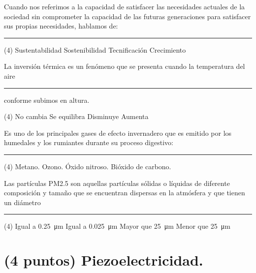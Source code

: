 \documentclass[12pt, letter]{exam}
\begin{document}
\begin{questions}
    \question Cuando nos referimos a la capacidad de satisfacer las necesidades actuales de la sociedad sin comprometer la capacidad de las futuras generaciones para satisfacer sus propias necesidades, hablamos de: \rule{2cm}{0.1mm}
    \begin{tasks}(4)
        \task Sustentabilidad
        \task Sostenibilidad
        \task Tecnificación
        \task Crecimiento
    \end{tasks}
    \question La inversión térmica es un fenómeno que se presenta cuando la temperatura del aire \rule{2cm}{0.1mm} conforme subimos en altura.
    \begin{tasks}(4)
        \task No cambia
        \task Se equilibra
        \task Disminuye
        \task Aumenta
    \end{tasks}
    \question Es uno de los principales gases de efecto invernadero que es emitido por los humedales y los rumiantes durante su proceso digestivo: \rule{2cm}{0.1mm}
    \begin{tasks}(4)
        \task Metano.
        \task Ozono.
        \task Óxido nitroso.
        \task Bióxido de carbono.
    \end{tasks}
    \question Las partículas PM2.5 son aquellas partículas sólidas o líquidas de diferente composición y tamaño que se encuentran dispersas en la atmósfera y que tienen un diámetro \rule{2cm}{0.1mm}
    \begin{tasks}(4)
        \task Igual a \SI{0.25}{\micro\meter}
        \task Igual a \SI{0.025}{\micro\meter}
        \task Mayor que \SI{25}{\micro\meter}
        \task Menor que \SI{25}{\micro\meter}
    \end{tasks}

    \section{(4 puntos) Piezoelectricidad.}


\end{questions}
\end{document}

